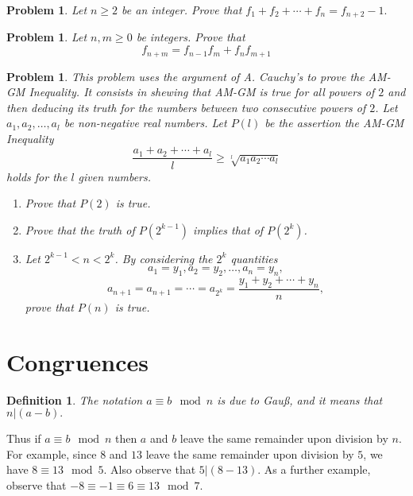 \documentclass[11pt, openany]{book}
\theoremstyle{change} \theoremheaderfont{\blue\sffamily\bfseries}
\newtheorem{df}[thm]{Definition}
\newtheorem{pro}[thm]{Problem}
\theoremstyle{nonumberplain} \theoremheaderfont{\sffamily\bfseries}
\newcommand{\í}{\'{\i}}
\begin{document}
\begin{multicols}{2}
\begin{pro} Let $n \geq 2$ be an integer.
Prove that $f_1 + f_2 + \cdots + f_n = f_{n + 2} - 1.$
\end{pro}
\begin{pro} Let $n, m\geq 0$ be  integers.
Prove that
\begin{equation}
f_{n + m} = f_{n - 1}f_m + f_nf_{m + 1}
\end{equation}
\end{pro}

\begin{pro}
This problem uses the argument of A. Cauchy's to prove the AM-GM
Inequality. It consists in shewing that AM-GM is true for all powers
of $2$ and then deducing its truth for the numbers between two
consecutive powers of $2$. Let $a_1, a_2, \ldots , a_l$ be
non-negative real numbers. Let $P(l)$ be the assertion the AM-GM
Inequality
$$\frac{a_1 + a_2 + \cdots + a_l}{l} \geq \sqrt[l]{a_1a_2\cdots a_l}$$holds for
the $l$ given numbers.
\begin{enumerate}
\item Prove that $P(2)$ is true. \item Prove that the truth of
$P(2^{k - 1})$  implies that of $P(2^k)$. \item Let $2^{k - 1} < n
< 2^k$. By considering the $2^k$ quantities
$$a_1 = y_1, a_2 = y_2, \ldots , a_n = y_n,$$
$$a_{n + 1} = a_{n + 1} = \cdots = a_{2^k} =\frac{y_1 + y_2 + \cdots
+ y_n}{n},$$prove that $P(n)$ is true.
\end{enumerate}
\end{pro}\end{multicols}
\section{Congruences}

\begin{df}
The notation $a \equiv b \mod n$ is due to Gau\ss , and it means
that $n|(a - b).$
\end{df}


Thus if $a \equiv b\mod n$  then $a$ and $b$ leave the same
remainder upon division by $n$.  For example, since $8$ and $13$
leave the same remainder upon division by $5$, we have $8 \equiv
13 \mod 5 $. Also observe that $5|(8 - 13).$  As a further
example, observe that $-8 \equiv -1 \equiv 6 \equiv 13 \mod 7$.
\end{document}
